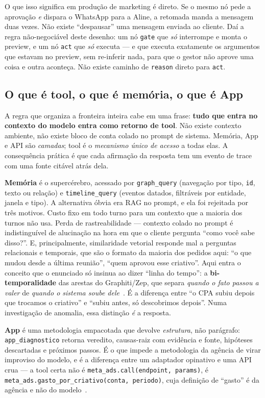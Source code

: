 \documentclass[10pt,twocolumn]{article}
\newcommand{\code}[1]{\texttt{\footnotesize #1}}
\begin{document}
O que isso significa em produção de marketing é direto. Se o mesmo nó pede a aprovação
\emph{e} dispara o WhatsApp para a Aline, a retomada manda a mensagem duas vezes. Não existe
``despausar'' uma mensagem enviada ao cliente. Daí a regra não-negociável deste desenho: um
nó \code{gate} que \emph{só} interrompe e monta o preview, e um nó \code{act} que \emph{só}
executa --- e que executa exatamente os argumentos que estavam no preview, sem re-inferir
nada, para que o gestor não aprove uma coisa e outra aconteça. Não existe caminho de
\code{reason} direto para \code{act}.

\subsection{O que é tool, o que é memória, o que é App}

A regra que organiza a fronteira inteira cabe em uma frase: \textbf{tudo que entra no
contexto do modelo entra como retorno de tool}. Não existe contexto ambiente, não existe
bloco de conta colado no prompt de sistema. Memória, App e API são \emph{camadas}; tool é o
\emph{mecanismo único de acesso} a todas elas. A consequência prática é que cada afirmação
da resposta tem um evento de trace com uma fonte citável atrás dela.

\textbf{Memória} é o supercérebro, acessado por \code{graph\_query} (navegação por tipo,
\code{id}, texto ou relação) e \code{timeline\_query} (eventos datados, filtráveis por
entidade, janela e tipo). A alternativa óbvia era RAG no prompt, e ela foi rejeitada por
três motivos. Custo fixo em todo turno para um contexto que a maioria dos turnos não usa.
Perda de rastreabilidade --- contexto colado no prompt é indistinguível de alucinação na
hora em que o cliente pergunta ``como você sabe disso?''. E, principalmente, similaridade
vetorial responde mal a perguntas relacionais e temporais, que são o formato da maioria dos
pedidos aqui: ``o que mudou desde a última reunião'', ``quem aprovou esse criativo''. Aqui
entra o conceito que o enunciado só insinua ao dizer ``linha do tempo'': a
\textbf{bi-temporalidade} das arestas do Graphiti/Zep, que separa \emph{quando o fato passou
a valer} de \emph{quando o sistema soube dele}~\cite{rasmussen2025zep}. É a diferença entre
``o CPA subiu depois que trocamos o criativo'' e ``subiu antes, só descobrimos depois''.
Numa investigação de anomalia, essa distinção \emph{é} a resposta.

\textbf{App} é uma metodologia empacotada que devolve \emph{estrutura}, não parágrafo:
\code{app\_diagnostico} retorna veredito, causas-raiz com evidência e fonte, hipóteses
descartadas e próximos passos. É o que impede a metodologia da agência de virar improviso do
modelo, e é a diferença entre um adaptador opinativo e uma API crua --- a tool certa não é
\code{meta\_ads.call(endpoint, params)}, é
\code{meta\_ads.gasto\_por\_criativo(conta, periodo)}, cuja definição de ``gasto'' é da
agência e não do modelo~\cite{vo2026harness}.
\end{document}
